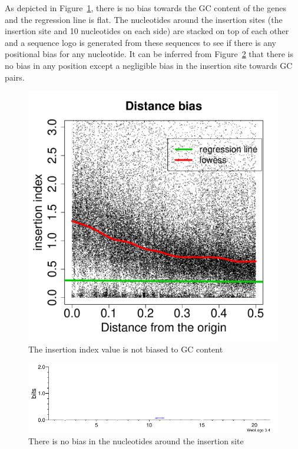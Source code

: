 \documentclass[a4paper,10pt, twocolumn]{article}
\begin{document}
As depicted in Figure~\ref{fig:GC_bias}, there is no bias towards the GC content of the genes and the regression line is flat. The nucleotides around the insertion sites (the insertion site and 10 nucleotides on each side) are stacked on top of each other and a sequence logo is generated from these sequences to see if there is any positional bias for any nucleotide. It can be inferred from Figure~\ref{fig:logo} that there is no bias in any position except a negligible bias in the insertion site towards GC pairs. 
\begin{figure}
\includegraphics[scale=0.28, page=2]{biases.pdf}
\caption{The insertion index value is not biased to GC content}
\label{fig:GC_bias}
\end{figure}

\begin{figure}
\includegraphics[scale=.98, angle = -90]{logo.pdf}
\caption{There is no bias in the nucleotides around the insertion site}
\label{fig:logo}
\end{figure}
\end{document}
